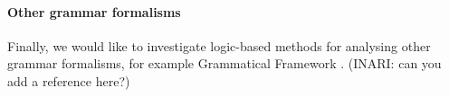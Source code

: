 \paragraph{Other grammar formalisms}
Finally, we would like to investigate logic-based methods for analysing other grammar
formalisms, for example Grammatical Framework \cite{gf}. (INARI: can you add a reference here?)





